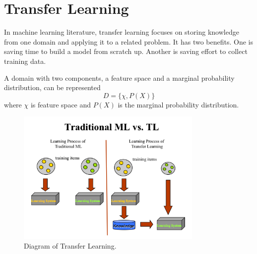 \section{Transfer Learning}

In machine learning literature, transfer learning\citep{pan2010survey} focuses on storing knowledge from one domain and applying it to a related problem. It has two benefits. One is saving time to build a model from scratch up. Another is saving effort to collect training data.

A domain with two components, a feature space and a marginal probability distribution, can be represented
\begin{equation}\label{eq:TransLearning}
D = \{ \chi, P(X) \}
\end{equation}
where $\chi$ is feature space and $P(X)$ is the marginal probability distribution. 
\graphicspath{ {./Figures/} }
\begin{figure}[!htb]
\centering
\includegraphics[width=0.8\textwidth]{MLvsTL.png}
\caption{\label{fig:perceptron}Diagram of Transfer Learning.}
\end{figure}
